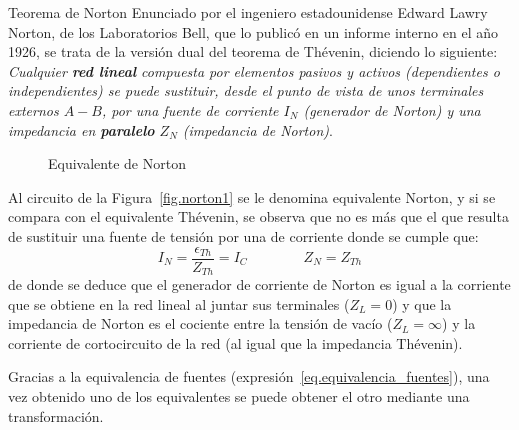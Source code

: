 \documentclass[11pt]{book} %
\makeatletter
\numberwithin{dummy}{section}
\theoremstyle{ocrenumbox}
\theoremstyle{blacknumex}
\theoremstyle{blacknumbox}
\theoremstyle{ocrenum}
\newenvironment{remark}{\par\vspace{10pt}\small %
\begin{list}{}{
\leftmargin=35pt %
\rightmargin=25pt}\item\ignorespaces %
\makebox[-2.5pt]{\begin{tikzpicture}[overlay]
\node[draw=ocre!60,line width=1pt,circle,fill=ocre!25,font=\sffamily\bfseries,inner sep=2pt,outer sep=0pt] at (-15pt,0pt){\textcolor{ocre}{N}};\end{tikzpicture}} %
\advance\baselineskip -1pt}{\end{list}\vskip5pt} %
\renewcommand{\subsection}{\@startsection {subsection}{2}{\z@}
{-3ex \@plus -0.1ex \@minus -.4ex}
{0.5ex \@plus.2ex }
{\normalfont\sffamily\bfseries}}
\newlength\esp
\makeatother
\begin{document}
\subsection{Teorema de Norton}
Enunciado por el ingeniero estadounidense Edward Lawry Norton, de los Laboratorios Bell, que lo publicó en un informe interno en el año 1926, se trata de la versión dual del teorema de Thévenin, diciendo lo siguiente: \textit{Cualquier \textbf{red lineal} compuesta por elementos pasivos y activos (dependientes o independientes) se puede sustituir, desde el punto de vista de unos terminales externos $A-B$, por una fuente de corriente $I_{N}$ (generador de Norton) y una impedancia en \textbf{paralelo} $Z_{N}$ (impedancia de Norton)}. 
\begin{figure}[htbp]
        \centering
        \hfil
        \caption{Equivalente de Norton}
        \label{fig.norton}
    \end{figure}

Al circuito de la Figura~\ref{fig.norton1} se le denomina equivalente Norton, y si se compara con el equivalente Thévenin, se observa que no es más que el que resulta de sustituir una fuente de tensión por una de corriente donde se cumple que: 
\begin{equation}
    \boxed{I_N=\dfrac{\epsilon_{Th}}{Z_{Th}}= I_C} \qquad\qquad \boxed{Z_N=Z_{Th}}
\end{equation}
de donde se deduce que el generador de corriente de Norton es igual a la corriente que se obtiene en la red lineal al juntar sus terminales ($Z_L=0$) y que la impedancia de Norton es el cociente entre la tensión de vacío ($Z_L=\infty$) y la corriente de cortocircuito de la red (al igual que la impedancia Thévenin).
\begin{remark}
    Gracias a la equivalencia de fuentes (expresión~\eqref{eq.equivalencia_fuentes}), una vez obtenido uno de los equivalentes se puede obtener el otro mediante una transformación.
\end{remark}
\end{document}
